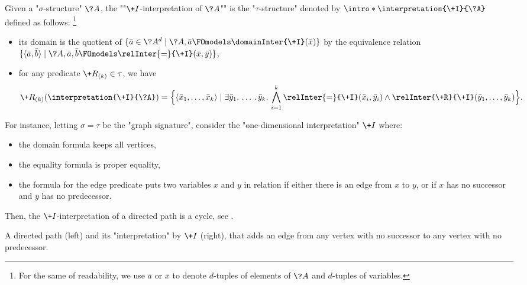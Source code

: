 Given a "$\sigma$-structure" $\?A$, the \AP""$\+I$-interpretation of $\?A$"" is the "$\tau$-structure" denoted by \AP$\intro*\interpretation{\+I}{\?A}$ defined as follows:%
\footnote{For the same of readability, we use $\bar a$ or $\bar x$ to
denote $d$-tuples of elements of $\?A$ and $d$-tuples of variables.}
\begin{itemize}
	\item its domain is the quotient of 
		$\{\bar a \in \?A^d \mid \?A, \bar a \FOmodels \domainInter{\+I}(\bar x)\}$
		by the equivalence relation
		$\set{\tup{\bar a, \bar b} \mid \?A, \bar a, \bar b \FOmodels \relInter{=}{\+I}(\bar x, \bar y)}$,
	\item for any predicate $\+R_{(k)} \in \tau$,
		we have
		\[
			\+R_{(k)}(\interpretation{\+I}{\?A}) =
			\Big\{\tup{\bar x_1, \dotsc, \bar x_k} \mid
				\exists \bar y_1.\, \dotsc.\, \bar y_k.\,
				\bigwedge_{i=1}^k \relInter{=}{\+I}(\bar x_i, \bar y_i)
				\land \relInter{\+R}{\+I}(\bar y_1, \dotsc, \bar y_k)
			\Big\}.
		\]
\end{itemize}
For instance, letting $\sigma =\tau$ be the "graph signature", consider
the "one-dimensional interpretation" $\+I$ where:
\begin{itemize}
	\item the domain formula keeps all vertices,
	\item the equality formula is proper equality,
	\item the formula for the edge predicate puts two variables $x$ and $y$ in relation
		if either there is an edge from $x$ to $y$, or if $x$ has no successor and $y$ has no predecessor.
\end{itemize}
Then, the $\+I$-interpretation of a directed path is a cycle,
see .
\begin{marginfigure}
	\centering
	\qquad
	\caption{
		\AP\label{fig:interpretation-path-into-cycle}
		A directed path (left) and its "interpretation" by $\+I$ (right),
		that adds an edge from any vertex with no successor to any vertex with no predecessor.
	}
\end{marginfigure}

